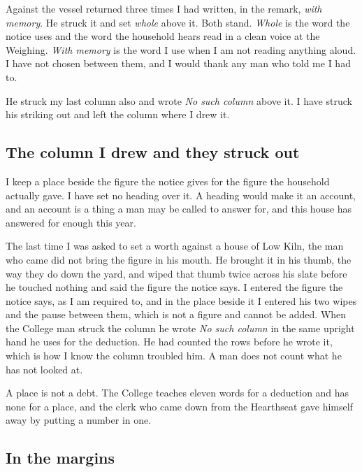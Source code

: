 \documentclass{design/chronicle}
\begin{document}
Against the vessel returned three times I had written, in the remark, \emph{with memory}. He struck it and set \emph{whole} above it. Both stand. \emph{Whole} is the word the notice uses and the word the household hears read in a clean voice at the Weighing. \emph{With memory} is the word I use when I am not reading anything aloud. I have not chosen between them, and I would thank any man who told me I had to.

He struck my last column also and wrote \emph{No such column} above it. I have struck his striking out and left the column where I drew it.

\subsection*{The column I drew and they struck out}

I keep a place beside the figure the notice gives for the figure the household actually gave. I have set no heading over it. A heading would make it an account, and an account is a thing a man may be called to answer for, and this house has answered for enough this year.

The last time I was asked to set a worth against a house of Low Kiln, the man who came did not bring the figure in his mouth. He brought it in his thumb, the way they do down the yard, and wiped that thumb twice across his slate before he touched nothing and said the figure the notice says. I entered the figure the notice says, as I am required to, and in the place beside it I entered his two wipes and the pause between them, which is not a figure and cannot be added. When the College man struck the column he wrote \emph{No such column} in the same upright hand he uses for the deduction. He had counted the rows before he wrote it, which is how I know the column troubled him. A man does not count what he has not looked at.

A place is not a debt. The College teaches eleven words for a deduction and has none for a place, and the clerk who came down from the Hearthseat gave himself away by putting a number in one.

\subsection*{In the margins}
\end{document}
